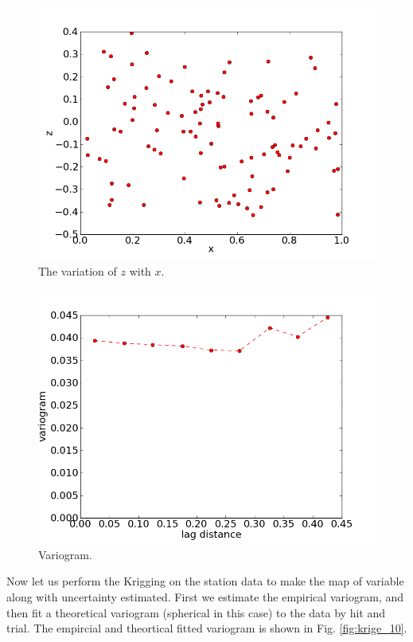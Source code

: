 \documentclass[10pt]{book}
\begin{document}
\beforefig
\begin{figure}[h!]
  \centering
    \includegraphics[scale=0.5]{images/krige_8.png}
  \caption{The variation of $z$ with $x$.}
   \label{fig:krige_8}
\end{figure}
\afterfig

\beforefig
\begin{figure}[h!]
  \centering
    \includegraphics[scale=0.5]{images/krige_9.png}
  \caption{Variogram.}
   \label{fig:krige_9}
\end{figure}
\afterfig

Now let us perform the Krigging on the station data to make the map of variable along with uncertainty estimated. First we estimate the empirical variogram, and then fit a theoretical variogram (spherical in this case) to the data by hit and trial. The empircial and theortical fitted variogram is shown in Fig. \ref{fig:krige_10}. 
\end{document}
